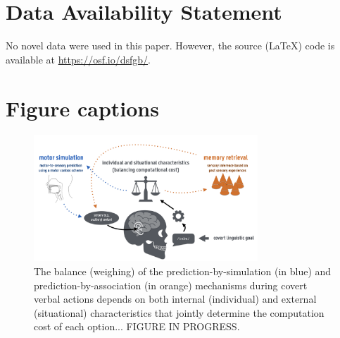 \documentclass[utf8]{template/frontiersSCNS} %
\begin{document}
\section*{Data Availability Statement}

No novel data were used in this paper. However, the source (\LaTeX) code is available at \url{https://osf.io/dsfgb/}.


% 



\section*{Figure captions}


\begin{figure}[ht] %
\begin{center}
\includegraphics[width=0.75\textwidth]{figures/association_simulation.png} %
\end{center}
\caption{The balance (weighing) of the prediction-by-simulation (in blue) and prediction-by-association (in orange) mechanisms during covert verbal actions depends on both internal (individual) and external (situational) characteristics that jointly determine the computation cost of each option... FIGURE IN PROGRESS.}\label{fig:1}
\end{figure}
\end{document}
